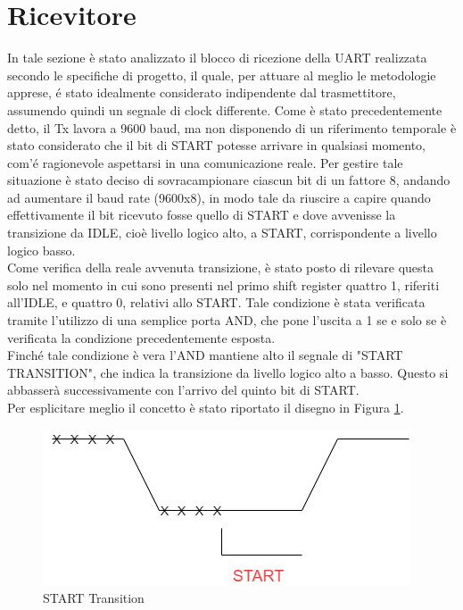 \documentclass[a4paper, titlepage]{article}
\begin{document}
\section{Ricevitore}
In tale sezione è stato analizzato il blocco di ricezione della UART realizzata secondo le specifiche di progetto, il quale, per attuare al meglio le metodologie apprese, é stato idealmente considerato indipendente dal trasmettitore, assumendo quindi un segnale di clock differente.
\newline
Come è stato precedentemente detto, il Tx lavora a 9600 baud, ma non disponendo di un riferimento temporale è stato considerato che il bit di START potesse arrivare in qualsiasi momento, com'é ragionevole aspettarsi in una comunicazione reale. Per gestire tale situazione è stato deciso di sovracampionare ciascun bit di un fattore 8, andando ad aumentare il baud rate (9600x8), in modo tale da riuscire a capire quando effettivamente il bit ricevuto fosse quello di START e dove avvenisse la transizione da IDLE, cioè livello logico alto, a START, corrispondente a livello logico basso.\\Come verifica della reale avvenuta transizione, è stato posto di rilevare questa solo nel momento in cui sono presenti nel primo shift register quattro 1, riferiti all'IDLE, e quattro 0, relativi allo START. Tale condizione è stata verificata tramite l'utilizzo di una semplice porta AND, che pone l'uscita a 1 se e solo se è verificata la condizione precedentemente esposta.\\ Finché tale condizione è vera l'AND mantiene alto il segnale di "START TRANSITION", che indica la transizione da livello logico alto a basso. Questo si abbasserà successivamente con l'arrivo del quinto bit di START.\\Per esplicitare meglio il concetto è stato riportato il disegno in Figura \ref{fig:my_label}.
\begin{figure}[h]
    \centering
    \includegraphics[scale=0.6]{Rx.png}    \caption{START Transition}
    \label{fig:my_label}
\end{figure}\\
\end{document}
